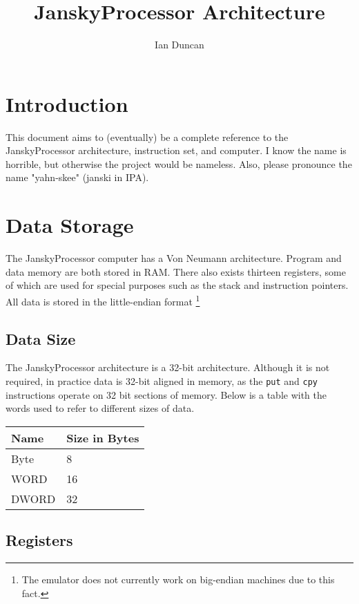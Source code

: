 \documentclass[12pt,letterpaper]{article}
\author{Ian Duncan}
\title{JanskyProcessor Architecture}
\begin{document}
\maketitle
\newpage
\tableofcontents
\section*{Introduction}
This document aims to (eventually) be a complete reference to the JanskyProcessor architecture, instruction set, and computer. I know the name is horrible, but otherwise the project would be nameless. Also, please pronounce the name "yahn-skee" (janski in IPA).
\section{Data Storage}
The JanskyProcessor computer has a Von Neumann architecture. Program and data memory are both stored in RAM. There also exists thirteen registers, some of which are used for special purposes such as the stack and instruction pointers.
\newline\newline
\noindent All data is stored in the little-endian format \footnote{The emulator does not currently work on big-endian machines due to this fact.}
\subsection{Data Size}

The JanskyProcessor architecture is a 32-bit architecture. Although it is not required, in practice data is 32-bit aligned in memory, as the \texttt{put} and \texttt{cpy} instructions operate on 32 bit sections of memory. 
\newline\newline
\noindent Below is a table with the words used to refer to different sizes of data.

\begin{center}
\begin{tabular}{ | l | l |}
\hline
\textbf{Name} & \textbf{Size in Bytes} \\ \hline
Byte & 8 \\ \hline
WORD & 16 \\ \hline
DWORD & 32 \\ \hline
\end{tabular}
\end{center}

\subsection{Registers}
\end{document}
